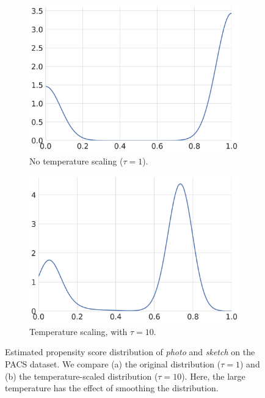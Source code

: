 \begin{figure}[ht!]
     \centering
     \begin{subfigure}[b]{0.49\textwidth}
         \centering
         \includegraphics[scale=0.2]{figures/ps_photo_sketch_temp1.png}
         \caption{No temperature scaling ($\tau = 1$).}
     \end{subfigure}
     \hfill
     \begin{subfigure}[b]{0.49\textwidth}
         \centering
         \includegraphics[scale=0.2]{figures/ps_photo_sketch_temp10.png}
         \caption{Temperature scaling, with $\tau=10$.}
     \end{subfigure}
    \caption{
        Estimated propensity score distribution of \emph{photo} and \emph{sketch} on the PACS
        dataset. We compare (a) the original distribution ($\tau=1$) and (b) the temperature-scaled
        distribution ($\tau=10$). Here, the large temperature has the effect of smoothing the
        distribution.
}
    \label{fig:pacs_ps_ps}
\end{figure}


